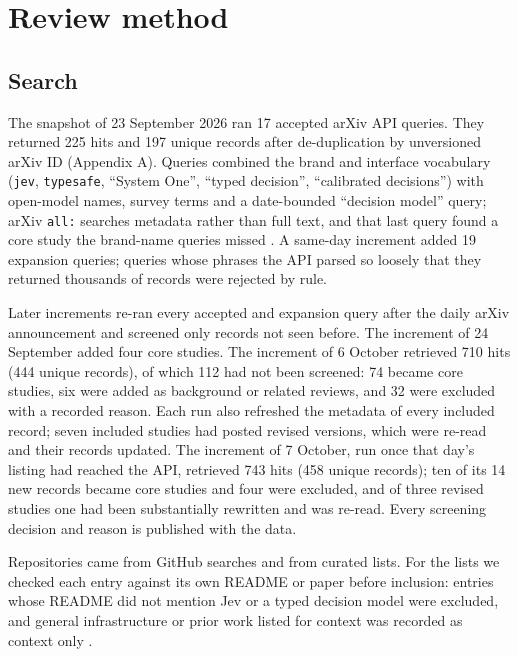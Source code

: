 \section{Review method}\label{sec:review-method}

\subsection{Search}

The snapshot of 23 September 2026 ran 17 accepted arXiv API queries. They returned 225 hits and 197 unique records after de-duplication by unversioned arXiv ID (Appendix A). Queries combined the brand and interface vocabulary (\texttt{jev}, \texttt{typesafe}, “System One”, “typed decision”, “calibrated decisions”) with open-model names, survey terms and a date-bounded “decision model” query; arXiv \texttt{all:} searches metadata rather than full text, and that last query found a core study the brand-name queries missed \citep{arxiv2609_24574}. A same-day increment added 19 expansion queries; queries whose phrases the API parsed so loosely that they returned thousands of records were rejected by rule.

Later increments re-ran every accepted and expansion query after the daily arXiv announcement and screened only records not seen before. The increment of 24 September added four core studies. The increment of 6 October retrieved 710 hits (444 unique records), of which 112 had not been screened: 74 became core studies, six were added as background or related reviews, and 32 were excluded with a recorded reason. Each run also refreshed the metadata of every included record; seven included studies had posted revised versions, which were re-read and their records updated. The increment of 7 October, run once that day's listing had reached the API, retrieved 743 hits (458 unique records); ten of its 14 new records became core studies and four were excluded, and of three revised studies one had been substantially rewritten and was re-read. Every screening decision and reason is published with the data.

Repositories came from GitHub searches and from curated lists. For the lists we checked each entry against its own README or paper before inclusion: entries whose README did not mention Jev or a typed decision model were excluded, and general infrastructure or prior work listed for context was recorded as context only \citep{gh_omnijev_awesome_jev_gallery}.

